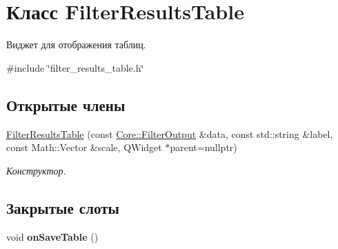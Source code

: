 \hypertarget{class_filter_results_table}{}\section{Класс Filter\+Results\+Table}
\label{class_filter_results_table}


Виджет для отображения таблиц.  




{\ttfamily \#include \char`\"{}filter\+\_\+results\+\_\+table.\+h\char`\"{}}

\subsection*{Открытые члены}
\begin{DoxyCompactItemize}
\item 
\hyperlink{class_filter_results_table_a343f304fd53bc8ed9f680ffb5ac6c8b4}{Filter\+Results\+Table} (const \hyperlink{namespace_core_a60877581a235fc9566087b54d463ce9c}{Core\+::\+Filter\+Output} \&data, const std\+::string \&label, const Math\+::\+Vector \&scale, Q\+Widget $\ast$parent=nullptr)\hypertarget{class_filter_results_table_a343f304fd53bc8ed9f680ffb5ac6c8b4}{}\label{class_filter_results_table_a343f304fd53bc8ed9f680ffb5ac6c8b4}

\begin{DoxyCompactList}\small\item\em Конструктор. \end{DoxyCompactList}\end{DoxyCompactItemize}
\subsection*{Закрытые слоты}
\begin{DoxyCompactItemize}
\item 
void {\bfseries on\+Save\+Table} ()\hypertarget{class_filter_results_table_a160f51c55773ed7981b67df9c3d533d8}{}\label{class_filter_results_table_a160f51c55773ed7981b67df9c3d533d8}

\end{DoxyCompactItemize}
